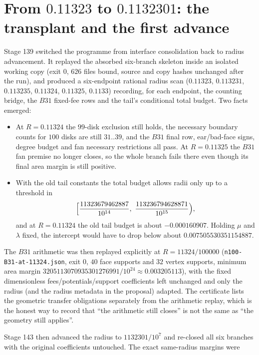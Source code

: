 \section{From $0.11323$ to $0.1132301$: the transplant and the first advance}

Stage 139 switched the programme from interface consolidation back to radius advancement. It
replayed the absorbed six-branch skeleton inside an isolated working copy (exit $0$, $626$ files
bound, source and copy hashes unchanged after the run), and produced a six-endpoint rational radius
scan ($0.11323$, $0.113231$, $0.113235$, $0.11324$, $0.11325$, $0.1133$) recording, for each
endpoint, the counting bridge, the $B31$ fixed-fee rows and the tail's conditional total budget.
Two facts emerged:

\begin{itemize}[leftmargin=1.4em,itemsep=2pt]
\item At $R=0.11324$ the $99$-disk exclusion still holds, the necessary boundary counts for $100$
disks are still $31..39$, and the $B31$ final row, ear/bad-face signs, degree budget and fan
necessary restrictions all pass. At $R=0.11325$ the $B31$ fan premise no longer closes, so the whole
branch fails there even though its final area margin is still positive.
\item With the old tail constants the total budget allows radii only up to a threshold in
\[
\Bigl[\frac{11323679462887}{10^{14}},\ \frac{113236794628871}{10^{15}}\Bigr),
\]
and at $R=0.11324$ the old tail budget is about $-0.000160907$. Holding $\mu$ and $\lambda$ fixed,
the intercept would have to drop below about $0.007505530351154887$.
\end{itemize}

The $B31$ arithmetic was then replayed explicitly at $R=11324/100000$
(\texttt{n100-\allowbreak{}B31-\allowbreak{}at-\allowbreak{}11324.json}, exit $0$, $40$ face supports and $32$ vertex supports, minimum
area margin $3205113070935301276991/10^{24}\approx0.003205113$), with the fixed dimensionless
fees/potentials/support coefficients left unchanged and only the radius (and the radius metadata in
the proposal) adapted. The certificate lists the geometric transfer obligations separately from the
arithmetic replay, which is the honest way to record that ``the arithmetic still closes'' is not the
same as ``the geometry still applies''.

Stage 143 then advanced the radius to $1132301/10^{7}$ and re-closed all six branches with the
original coefficients untouched. The exact same-radius margins were

